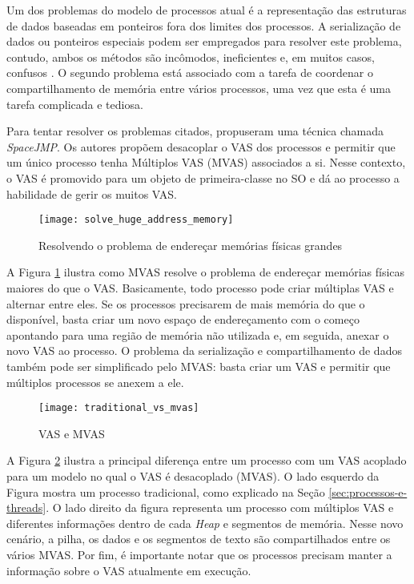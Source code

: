 Um dos problemas do modelo de processos atual é a representação
das estruturas de dados baseadas em ponteiros fora dos
limites dos processos. A serialização de dados ou ponteiros especiais podem ser
empregados para resolver este problema, contudo, ambos os métodos são
incômodos, ineficientes e, em muitos casos, confusos \citep{spacejmp}. O segundo
problema está associado com a tarefa de coordenar o compartilhamento de memória
entre vários processos, uma vez que esta é uma tarefa complicada e tediosa.

Para tentar resolver os problemas citados, \citet{spacejmp} propuseram uma
técnica chamada \emph{SpaceJMP}. Os autores propõem desacoplar o VAS dos
processos e permitir que um único processo tenha Múltiplos VAS (MVAS)
associados a si. Nesse contexto, o VAS é promovido para um objeto de
primeira-classe no SO e dá ao processo a habilidade de gerir os muitos
VAS.

\begin{figure}[!h]
  \centering
  \texttt{[image: solve\_huge\_address\_memory]}
  \caption{Resolvendo o problema de endereçar memórias físicas grandes}
  \label{fig:large_memory}
\end{figure}

A Figura \ref{fig:large_memory} ilustra como MVAS resolve o problema de
endereçar memórias físicas maiores do que o VAS. Basicamente, todo processo
pode criar múltiplas VAS e alternar entre eles. Se os processos precisarem de
mais memória do que o disponível, basta criar um novo espaço de endereçamento
com o começo apontando para uma região de memória não utilizada e, em seguida,
anexar o novo VAS ao processo. O problema da serialização e compartilhamento de
dados também pode ser simplificado pelo MVAS: basta criar um VAS e permitir que
múltiplos processos se anexem a ele.

\begin{figure}[!h]
  \centering
  \texttt{[image: traditional\_vs\_mvas]} 
	\caption[VAS e MVAS]{VAS e MVAS \citep{spacejmp}}
  \label{fig:traditional_vs_mvas} 
\end{figure}

A Figura \ref{fig:traditional_vs_mvas} ilustra a principal diferença entre um
processo com um VAS acoplado para um modelo no qual o VAS é desacoplado
(MVAS). O lado esquerdo da Figura mostra um processo tradicional, como explicado
na Seção \ref{sec:processos-e-threads}. O lado direito da figura representa um
processo com múltiplos VAS e diferentes informações dentro de cada \emph{Heap}
e segmentos de memória. Nesse novo cenário, a pilha, os dados e os segmentos
de texto são compartilhados entre os vários MVAS. Por fim, é importante
notar que os processos precisam manter a informação sobre o VAS atualmente em
execução.
 

